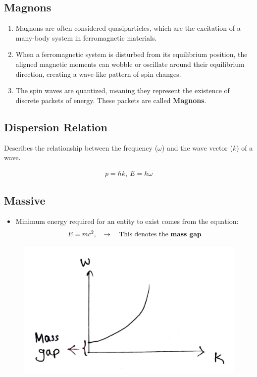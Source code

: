 \documentclass[14pt]{article} %
\begin{document}
\subsection*{Magnons}
\begin{enumerate}
    \item Magnons are often considered quasiparticles, which are the excitation of a many-body system in ferromagnetic materials.
    
    \item When a ferromagnetic system is disturbed from its equilibrium position, the aligned magnetic moments can wobble or oscillate around their equilibrium direction, creating a wave-like pattern of spin changes.
    
    \item The spin waves are quantized, meaning they represent the existence of discrete packets of energy. These packets are called \textbf{Magnons}.
\end{enumerate}

\subsection*{Dispersion Relation}
Describes the relationship between the frequency ($\omega$) and the wave vector ($k$) of a wave.

\begin{align*}
\boxed{p = \hbar k,~ E = \hbar \omega}
\end{align*}

\subsection*{Massive}
\begin{itemize}
    \item Minimum energy required for an entity to exist comes from the equation:
    \begin{align*}
    E = mc^2, \quad\rightarrow\quad\text{This denotes the \textbf{mass gap}}
    \end{align*}
\end{itemize}
\vspace{-1cm}
\begin{figure}[H]
\centering
\includegraphics[width=0.6\linewidth]{L(-2)_1.jpg}
\caption*{}
\end{figure}
\vspace{-1.5cm}
\end{document}
